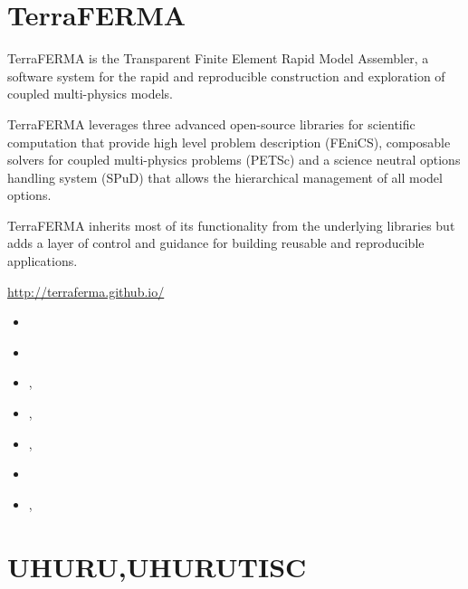 \section{TerraFERMA} 
TerraFERMA is the Transparent Finite Element Rapid Model Assembler, a software 
system for the rapid and reproducible construction and exploration of coupled multi-physics models.

TerraFERMA leverages three advanced open-source libraries for scientific computation that 
provide high level problem description (FEniCS), composable solvers for coupled multi-physics 
problems (PETSc) and a science neutral options handling system (SPuD) that allows the hierarchical 
management of all model options.

TerraFERMA inherits most of its functionality from the underlying libraries but adds a layer of 
control and guidance for building reusable and reproducible applications.

\url{http://terraferma.github.io/}

\begin{small}
\begin{itemize}
\item[\twothousandfourteen]  \textcite{wisv14}
\item[\twothousandsixteen]   \textcite{spmw16}
\item[\twothousandseventeen] \textcite{wisv17}, \textcite{ceww17}
\item[\twothousandnineteen]  \textcite{ceww19}, \textcite{perr19}
\item[\twothousandtwenty]    \textcite{siss20}, \textcite{abvw20}
\item[\twothousandtwentytwo] \textcite{ceap22}
\item[\twothousandtwentythree] \textcite{vawi23},  \textcite{vawi23b}
\end{itemize}
\end{small}





\section{UHURU,UHURUTISC} 

